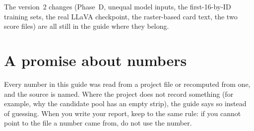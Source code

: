 The version~2 changes (Phase~D, unequal model inputs, the first-16-by-ID training sets, the real LLaVA checkpoint, the raster-based card text, the two score files) are all still in the guide where they belong.

\section{A promise about numbers}

Every number in this guide was read from a project file or recomputed from one, and the source is named. Where the project does not record something (for example, why the candidate pool has an empty strip), the guide says so instead of guessing. When you write your report, keep to the same rule: if you cannot point to the file a number came from, do not use the number.
